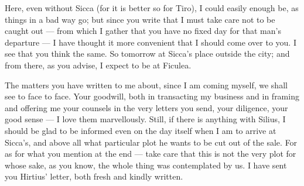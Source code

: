

 Here, even without Sicca (for it is better so for Tiro), I could easily enough be, as things in a bad way go; but since you write that I must take care not to be caught out --- from which I gather that you have no fixed day for that man's departure --- I have thought it more convenient that I should come over to you. I see that you think the same. So tomorrow at Sicca's place outside the city; and from there, as you advise, I expect to be at Ficulea.

 The matters you have written to me about, since I am coming myself, we shall see to face to face. Your goodwill, both in transacting my business and in framing and offering me your counsels in the very letters you send, your diligence, your good sense --- I love them marvellously. Still, if there is anything with Silius, I should be glad to be informed even on the day itself when I am to arrive at Sicca's, and above all what particular plot he wants to be cut out of the sale. For as for what you mention at the end --- take care that this is not the very plot for whose sake, as you know, the whole thing was contemplated by us. I have sent you Hirtius' letter, both fresh and kindly written.
